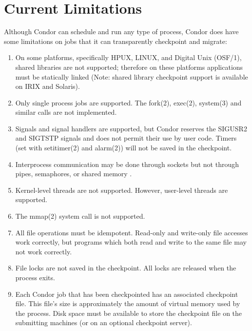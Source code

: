 \section{\label{sec:current-limitations}Current Limitations}

\begin{description}

	\item[Limitations on Jobs which can Checkpointed] Although Condor can schedule and
run any type of process, Condor does have some limitations on jobs that it can
transparently checkpoint and migrate:
\begin{enumerate}
	\item On some platforms, specifically HPUX, LINUX, 
and Digital Unix
(OSF/1),
shared libraries are not supported; therefore on these
platforms applications must be statically linked (Note: shared library
checkpoint support is available on IRIX and Solaris). 
	\item Only single process jobs are supported. The fork(2),
exec(2),
system(3)
and similar calls are not implemented.
	\item Signals and signal handlers 
are supported, but Condor reserves the 
SIGUSR2 and SIGTSTP signals and does not permit their use by user code.
Timers (set with setitimer(2)
and
alarm(2))
will not be saved in the checkpoint.
	\item Interprocess communication may be done through
sockets  but not through pipes, 
semaphores,   or shared memory
.
	\item Kernel-level threads are not supported.  However, user-level
threads are supported.
	\item The mmap(2)
system call is not supported.
	\item All file operations must be idempotent.
Read-only and write-only file accesses work correctly,
but programs which both read and write to the same file may not
work correctly.
	\item File locks
are not saved in the checkpoint.  All locks
are released when the process exits.
	\item Each Condor job that has been checkpointed has an associated 
checkpoint file.
This file's size is approximately the amount of virtual memory used by the 
process. Disk space must be available to store the checkpoint file on the 
submitting machines (or on an optional checkpoint server).
\end{enumerate}


\end{description}
